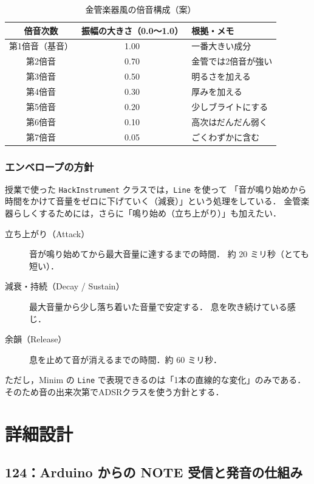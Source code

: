 \documentclass[a4paper,12pt]{jsarticle}
\begin{document}
\begin{table}[h]
  \centering
  \caption{金管楽器風の倍音構成（案）}
  \label{tab:harmonics}
  \begin{tabular}{ccl}
    \toprule
    倍音次数 & 振幅の大きさ（0.0〜1.0） & 根拠・メモ \\
    \midrule
    第1倍音（基音） & 1.00 & 一番大きい成分 \\
    第2倍音         & 0.70 & 金管では2倍音が強い \\
    第3倍音         & 0.50 & 明るさを加える \\
    第4倍音         & 0.30 & 厚みを加える \\
    第5倍音         & 0.20 & 少しブライトにする \\
    第6倍音         & 0.10 & 高次はだんだん弱く \\
    第7倍音         & 0.05 & ごくわずかに含む \\
    \bottomrule
  \end{tabular}
\end{table}

\subsubsection{エンベロープの方針}

授業で使った \texttt{HackInstrument} クラスでは，\texttt{Line} を使って
「音が鳴り始めから時間をかけて音量をゼロに下げていく（減衰）」という処理をしている．
金管楽器らしくするためには，さらに「鳴り始め（立ち上がり）」も加えたい．

\begin{description}
  \item[立ち上がり（Attack）] 音が鳴り始めてから最大音量に達するまでの時間．
        約 20 ミリ秒（とても短い）．
  \item[減衰・持続（Decay / Sustain）] 最大音量から少し落ち着いた音量で安定する．
        息を吹き続けている感じ．
  \item[余韻（Release）] 息を止めて音が消えるまでの時間．約 60 ミリ秒．
\end{description}

\noindent
ただし，Minim の \texttt{Line} で表現できるのは「1本の直線的な変化」のみである．
そのため音の出来次第でADSRクラスを使う方針とする．

\section{詳細設計}

\subsection{124：Arduino からの NOTE 受信と発音の仕組み}
\label{sec:detail-124}
\end{document}
